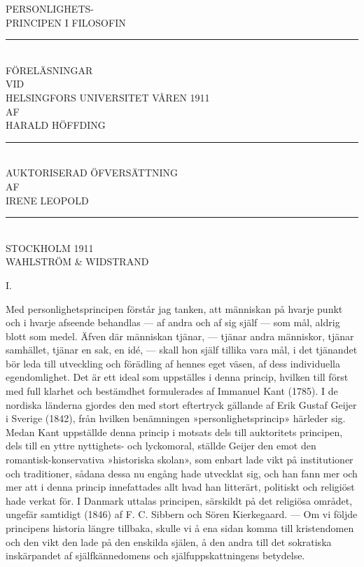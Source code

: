 \documentclass[12pt]{article}
\newcommand{\opage}[1]{\marginnote{\footnotesize\textit{[#1]}}}
\begin{document}
\begin{center}
{\LARGE PERSONLIGHETS-}\\[0.3em]
{\LARGE PRINCIPEN I FILOSOFIN}\\[1em]
\rule{1.5cm}{0.4pt}\\[1em]
FÖRELÄSNINGAR\\
{\small VID}\\
HELSINGFORS UNIVERSITET VÅREN 1911\\
{\small AF}\\
{\large HARALD HÖFFDING}\\[1em]
\rule{1.5cm}{0.4pt}\\[1em]
AUKTORISERAD ÖFVERSÄTTNING\\
{\small AF}\\
IRENE LEOPOLD\\[6em]
\rule{3cm}{0.4pt}\\[4em]
STOCKHOLM 1911\\
WAHLSTRÖM \& WIDSTRAND
\end{center}
\clearpage

%
\opage{5}
\begin{center}\large I.\end{center}

Med personlighetsprincipen förstår jag tanken, att människan på hvarje punkt och i hvarje afseende behandlas --- af andra och af sig själf --- som mål, aldrig blott som medel. Äfven där människan tjänar, --- tjänar andra människor, tjänar samhället, tjänar en sak, en idé, --- skall hon själf tillika vara mål, i det tjänandet bör leda till utveckling och förädling af hennes eget väsen, af dess individuella egendomlighet. Det är ett ideal som uppställes i denna princip, hvilken till först med full klarhet och bestämdhet formulerades af Immanuel Kant (1785). I de nordiska länderna gjordes den med stort eftertryck gällande af Erik Gustaf Geijer i Sverige (1842), från hvilken benämningen »personlighetsprincip» härleder sig. Medan Kant uppställde denna princip i motsats dels till auktoritets%
\opage{6}
principen, dels till en yttre nyttighets- och lyckomoral, ställde Geijer den emot den romantisk-konservativa »historiska skolan», som enbart lade vikt på institutioner och traditioner, sådana dessa nu engång hade utvecklat sig, och han fann mer och mer att i denna princip innefattades allt hvad han litterärt, politiskt och religiöst hade verkat för. I Danmark uttalas principen, särskildt på det religiösa området, ungefär samtidigt (1846) af F. C. Sibbern och Sören Kierkegaard. --- Om vi följde principens historia längre tillbaka, skulle vi å ena sidan komma till kristendomen och den vikt den lade på den enskilda själen, å den andra till det sokratiska inskärpandet af själfkännedomens och själfuppskattningens betydelse.
\end{document}

